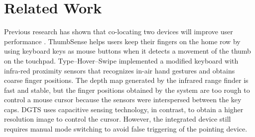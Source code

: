 
\section{Related Work}
Previous research has shown that co-locating two devices will improve user performance \cite{TouchNType}.
ThumbSense \cite{ThumbSense} helps users keep their fingers on the home row by using keyboard keys as mouse buttons when it detects a movement of the thumb on the touchpad.
Type–Hover–Swipe \cite {96bytes} implemented a modified keyboard with infra-red proximity sensors that recognizes in-air hand gestures and obtains coarse finger positions. The depth map generated by the infrared range finder is fast and stable, but the finger positions obtained by the system are too rough to control a mouse cursor because the sensors were interspersed between the key caps.
DGTS \cite{DTGS} uses capacitive sensing technology, in contrast, to obtain a higher resolution image to control the cursor. However, the integrated device still requires manual mode switching to avoid false triggering of the pointing device.
